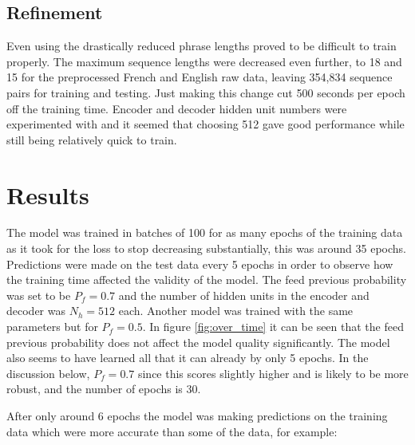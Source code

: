 \documentclass[]{article}
\begin{document}
\subsection{Refinement}
Even using the drastically reduced phrase lengths proved to be difficult to train properly. The maximum sequence lengths were decreased even further, to 18 and 15 for the preprocessed French and English raw data, leaving 354,834 sequence pairs for training and testing. Just making this change cut 500 seconds per epoch off the training time. Encoder and decoder hidden unit numbers were experimented with and it seemed that choosing 512 gave good performance while still being relatively quick to train.
\section{Results}
The model was trained in batches of 100 for as many epochs of the training data as it took for the loss to stop decreasing substantially, this was around 35 epochs. Predictions were made on the test data every 5 epochs in order to observe how the training time affected the validity of the model. The feed previous probability was set to be $P_f=0.7$ and the number of hidden units in the encoder and decoder was $N_h=512$ each. Another model was trained with the same parameters but for $P_f=0.5$. In figure \ref{fig:over_time} it can be seen that the feed previous probability does not affect the model quality significantly. The model also seems to have learned all that it can already by only 5 epochs. In the discussion below, $P_f=0.7$ since this scores slightly higher and is likely to be more robust, and the number of epochs is 30.

After only around 6 epochs the model was making predictions on the training data which were more accurate than some of the data, for example: 
\end{document}
